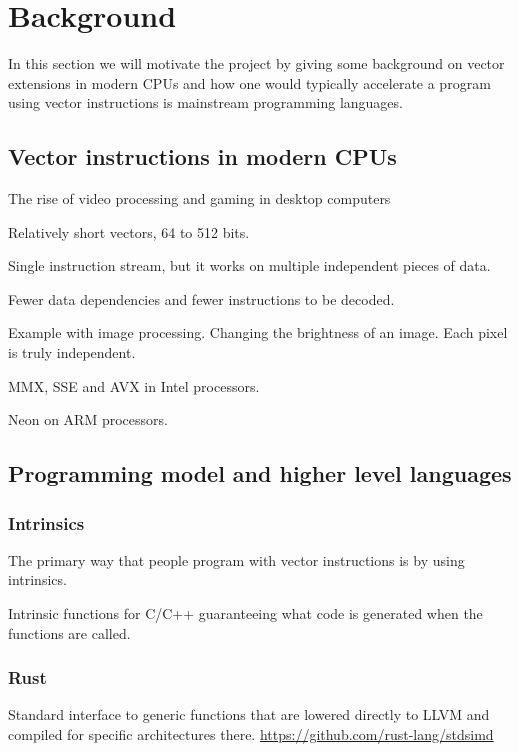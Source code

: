 \documentclass{article}
\begin{document}
\section{Background}

In this section we will motivate the project by giving some background on vector extensions in modern CPUs and how one would typically accelerate a program using vector instructions is mainstream programming languages.

\subsection{Vector instructions in modern CPUs}

The rise of video processing and gaming in desktop computers 

Relatively short vectors, 64 to 512 bits.


Single instruction stream, but it works on multiple independent pieces of data.

Fewer data dependencies and fewer instructions to be decoded.

Example with image processing. Changing the brightness of an image. Each pixel is truly independent.

MMX, SSE and AVX in Intel processors.

Neon on ARM processors.

\subsection{Programming model and higher level languages}

\subsubsection{Intrinsics}

The primary way that people program with vector instructions is by using intrinsics.

Intrinsic functions for C/C++ guaranteeing what code is generated when the functions are called.

\subsubsection{Rust}

Standard interface to generic functions that are lowered directly to LLVM and compiled for specific architectures there.
\url{https://github.com/rust-lang/stdsimd}
\end{document}
